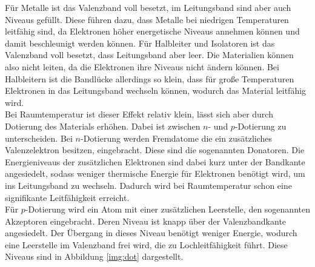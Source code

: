 \noindent
Für Metalle ist das Valenzband voll besetzt, im Leitungsband sind aber auch Niveaus gefüllt. 
Diese führen dazu, dass Metalle bei niedrigen Temperaturen leitfähig sind, da Elektronen höher energetische Niveaus annehmen können und damit beschleunigt werden können.
Für Halbleiter und Isolatoren ist das Valenzband voll besetzt, dass Leitungsband aber leer. Die Materialien können also nicht leiten, da die Elektronen ihre Niveaus nicht ändern können.
Bei Halbleitern ist die Bandlücke allerdings so klein, dass für große Temperaturen Elektronen in das Leitungsband wechseln können, wodurch das Material leitfähig wird.\\
Bei Raumtemperatur ist dieser Effekt relativ klein, lässt sich aber durch Dotierung des Materials erhöhen. Dabei ist zwischen $n$- und $p$-Dotierung zu unterscheiden.
Bei $n$-Dotierung werden Fremdatome die ein zusätzliches Valenzelektron besitzen, eingebracht. Diese sind die sogenannten Donatoren. 
Die Energieniveaus der zusätzlichen Elektronen sind dabei kurz unter der Bandkante angesiedelt, sodass weniger thermische Energie für Elektronen benötigt wird, 
um ins Leitungsband zu wechseln.
Dadurch wird bei Raumtemperatur schon eine signifikante Leitfähigkeit erreicht.\\
Für $p$-Dotierung wird ein Atom mit einer zusätzlichen Leerstelle, den sogenannten Akzeptoren eingebracht.
Deren Niveau ist knapp über der Valenzbandkante angesiedelt. 
Der Übergang in dieses Niveau benötigt weniger Energie, wodurch eine Leerstelle im Valenzband frei wird, die zu Lochleitfähigkeit führt.
Diese Niveaus sind in Abbildung \ref{img:dot} dargestellt. \\\\

